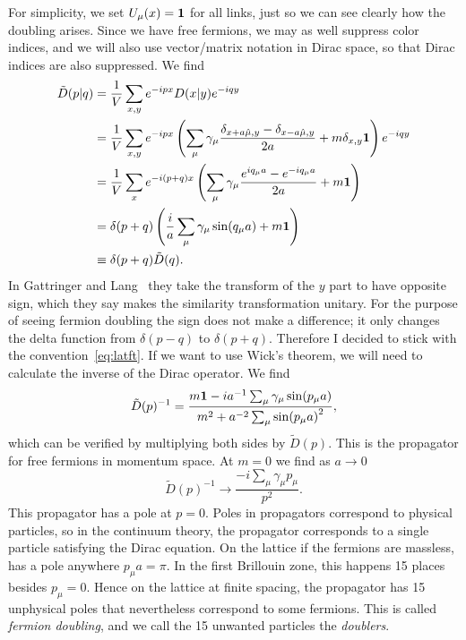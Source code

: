 For simplicity, we set $U_\mu(x)={\mathbf 1}$
for all links, just so we can see clearly how the doubling arises.
Since we have free fermions, we may as well suppress color indices,
and we will also use vector/matrix notation in Dirac space, so that
Dirac indices are also suppressed. We find
\begin{equation}\begin{aligned}
  \tilde{D}(p|q)&=\frac{1}{V}\sum_{x,y}e^{-ipx}D(x|y)e^{-iqy}\\
     &=\frac{1}{V}\sum_{x,y}e^{-ipx}\left(
      \sum_\mu\gamma_\mu\frac{\delta_{x+a\hat{\mu},y}
                             -\delta_{x-a\hat{\mu},y}}{2a}+m\delta_{x,y}{\mathbf 1}
      \right)e^{-iqy}\\
     &=\frac{1}{V}\sum_xe^{-i(p+q)x}\left(
      \sum_\mu\gamma_\mu\frac{e^{iq_\mu a}-e^{-iq_\mu a}}{2a}+m{\mathbf 1}\right)\\
     &=\delta(p+q)\left(\frac{i}{a}\sum_\mu
                    \gamma_\mu\sin(q_\mu a)+m{\mathbf 1}\right)\\
     &\equiv\delta(p+q)\tilde{D}(q).
\end{aligned}\end{equation}
In Gattringer and Lang~\cite{gattringer_quantum_2010} they take the transform
of the $y$ part to have opposite sign, which they say makes the similarity
transformation unitary. For the purpose of seeing fermion doubling
the sign does not make a difference; it only changes the delta
function from $\delta(p-q)$ to $\delta(p+q)$. Therefore I decided to stick
with the convention~\eqref{eq:latft}. If we want to use Wick's theorem,
we will need to calculate the inverse of the Dirac operator. We find
\begin{equation}\label{eq:latprop}
  \tilde{D}(p)^{-1}=\frac{m{\mathbf 1}-ia^{-1}\sum_\mu\gamma_\mu\sin(p_\mu a)}
                         {m^2+a^{-2}\sum_\mu\sin(p_\mu a)^2},
\end{equation}
which can be verified by multiplying both sides by $\tilde{D}(p)$. This
is the propagator for free fermions in momentum space. At $m=0$ we find
as $a\to0$
\begin{equation}
  \tilde{D}(p)^{-1}\to\frac{-i\sum_\mu\gamma_\mu p_\mu}{p^2}.
\end{equation}
This propagator has a pole at $p=0$. Poles in propagators correspond
to physical particles, so in the continuum theory, the propagator
corresponds to a single particle satisfying the Dirac equation. On
the lattice if the fermions are massless,  has
a pole anywhere $p_\mu a=\pi$. In the first Brillouin zone, this
happens 15 places besides $p_\mu=0$. Hence on the lattice at finite
spacing, the propagator has 15 unphysical poles that nevertheless
correspond to some fermions. This is called {\it fermion doubling},
and we call the 15 unwanted particles the {\it doublers}.

